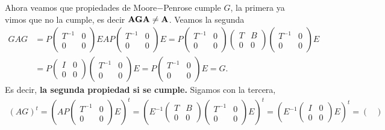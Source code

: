 \documentclass[11pt,letterpaper]{article}
\begin{document}
\begin{enumerate}
Ahora veamos que propiedades de Moore$-$Penrose cumple $G$, la primera ya vimos que no la cumple, es decir $\bf AGA\neq A$. Veamos la segunda 
\begin{align*}
GAG&= P\begin{pmatrix}
T^{-1} & 0\\
0 & 0
\end{pmatrix}E A P\begin{pmatrix}
T^{-1} & 0\\
0 & 0
\end{pmatrix}E=P\begin{pmatrix}
T^{-1} & 0\\
0 & 0
\end{pmatrix}\begin{pmatrix}
T & B\\
0 & 0
\end{pmatrix} \begin{pmatrix}
T^{-1} & 0\\
0 & 0
\end{pmatrix}E\\
&=P\begin{pmatrix}
I & 0\\
0 & 0 
\end{pmatrix}\begin{pmatrix}
T^{-1} & 0\\
0 & 0
\end{pmatrix}E=P\begin{pmatrix}
T^{-1}& 0\\
0& 0
\end{pmatrix} E = G.
\end{align*}
Es decir, \textbf{la segunda propiedad si se cumple.} Sigamos con la tercera, 
\begin{align*}
(AG)^t = \left(A P \begin{pmatrix}
T^{-1} & 0 \\
0 & 0
\end{pmatrix}E \right)^t =  \left(E^{-1}\begin{pmatrix}
T & B \\
0 & 0
\end{pmatrix} \begin{pmatrix}
T^{-1} & 0 \\
0 & 0
\end{pmatrix}E \right)^t= \left( E^{-1} \begin{pmatrix}
I & 0 \\
0 & 0
\end{pmatrix}E\right)^t= \begin{pmatrix}

\end{pmatrix}
\end{align*}
\end{enumerate}
\end{document}
